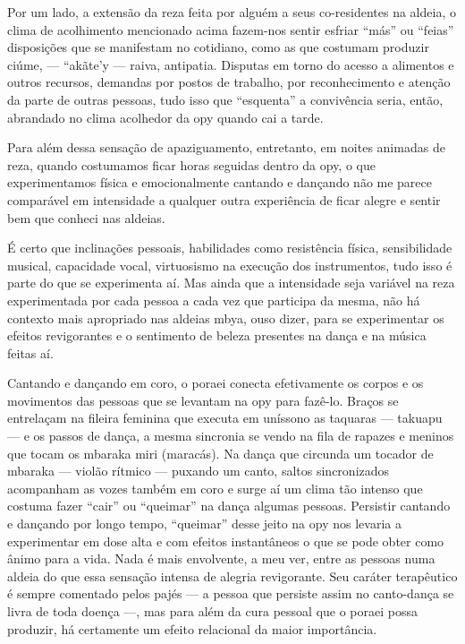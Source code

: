 Por um lado, a extensão da reza feita por alguém a seus co-residentes na
aldeia, o clima de acolhimento mencionado acima fazem-nos sentir
esfriar ``más'' ou ``feias'' disposições que se manifestam no cotidiano,
como as que costumam produzir ciúme, --- ``akãte’y --- raiva, antipatia.
Disputas em torno do acesso a alimentos e outros recursos, demandas por
postos de trabalho, por reconhecimento e atenção da parte de outras
pessoas, tudo isso que ``esquenta'' a convivência seria, então, abrandado
no clima acolhedor da opy quando cai a tarde.

Para além dessa sensação de apaziguamento, entretanto, em noites
animadas de reza, quando costumamos ficar horas seguidas dentro da opy,
o que experimentamos física e emocionalmente cantando e dançando não me
parece comparável em intensidade a qualquer outra experiência de ficar
alegre e sentir bem que conheci nas aldeias.

É certo que inclinações pessoais, habilidades como resistência física,
sensibilidade musical, capacidade vocal, virtuosismo na execução dos
instrumentos, tudo isso é parte do que se experimenta aí. Mas ainda que
a intensidade seja variável na reza experimentada por cada pessoa a
cada vez que participa da mesma, não há contexto mais apropriado nas
aldeias mbya, ouso dizer, para se experimentar os efeitos revigorantes
e o sentimento de beleza presentes na dança e na música feitas aí.

Cantando e dançando em coro, o poraei conecta efetivamente os corpos e
os movimentos das pessoas que se levantam na opy para fazê-lo. Braços
se entrelaçam na fileira feminina que executa em uníssono as taquaras ---
takuapu --- e os passos de dança, a mesma sincronia se vendo na fila de
rapazes e meninos que tocam os mbaraka miri (maracás). Na dança que
circunda um tocador de mbaraka --- violão rítmico --- puxando um canto,
saltos sincronizados acompanham as vozes também em coro e surge aí um
clima tão intenso que costuma fazer ``cair'' ou ``queimar'' na dança
algumas pessoas. Persistir cantando e dançando por longo tempo,
``queimar'' desse jeito na opy nos levaria a experimentar em dose alta e
com efeitos instantâneos o que se pode obter como ânimo para a vida.
Nada é mais envolvente, a meu ver, entre as pessoas numa aldeia do que
essa sensação intensa de alegria revigorante. Seu caráter terapêutico é
sempre comentado pelos pajés --- a pessoa que persiste assim no canto-dança
se livra de toda doença ---, mas para além da cura pessoal que o
poraei possa produzir, há certamente um efeito relacional da maior
importância.

